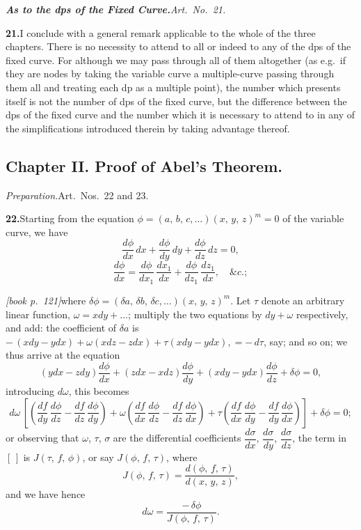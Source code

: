 \documentclass[11pt,a4paper]{article}
\theoremstyle{plain}
\theoremstyle{definition}
\theoremstyle{remark}
\begin{document}
\medskip\noindent\textit{\textbf{As to the dps of the Fixed Curve.}\quad Art.\ No.~21.}

\medskip\noindent\textbf{21.}\quad I conclude with a general remark applicable to the whole of the three chapters. There is no necessity to attend to all or indeed to any of the dps of the fixed curve. For although we may pass through all of them altogether (as e.g.\ if they are nodes by taking the variable curve a multiple-curve passing through them all and treating each dp as a multiple point), the number which presents itself is not the number of dps of the fixed curve, but the difference between the dps of the fixed curve and the number which it is necessary to attend to in any of the simplifications introduced therein by taking advantage thereof.

\subsection*{Chapter II. Proof of Abel's Theorem.}

\medskip\noindent\textit{Preparation.}\quad Art.\ Nos.\ 22 and 23.

\medskip\noindent\textbf{22.}\quad Starting from the equation $\phi = (a,\,b,\,c,\ldots)(x,\,y,\,z)^m = 0$ of the variable curve, we have
\[
\frac{d\phi}{dx}\,dx + \frac{d\phi}{dy}\,dy + \frac{d\phi}{dz}\,dz = 0,
\]
\[
\frac{d\phi}{dx} = \frac{d\phi}{dx_1}\,\frac{dx_1}{dx} + \frac{d\phi}{dz_1}\,\frac{dz_1}{dx},\quad \&c.;
\]

\noindent\textit{[book p.~121]}\quad where $\delta\phi = (\delta a,\,\delta b,\,\delta c,\ldots)(x,\,y,\,z)^m$. Let $\tau$ denote an arbitrary linear function, $\omega = x dy + \ldots$; multiply the two equations by $dy + \omega$ respectively, and add: the coefficient of $\delta a$ is $-\,(x dy - y dx) + \omega(x dz - z dx) + \tau(x dy - y dx), = -\,d\tau$, say; and so on; we thus arrive at the equation
\[
(y dx - z dy)\frac{d\phi}{dx} + (z dx - x dz)\frac{d\phi}{dy} + (x dy - y dx)\frac{d\phi}{dz} + \delta\phi = 0,
\]
introducing $d\omega$, this becomes
\[
d\omega\,\left[\left(\frac{df}{dy}\,\frac{d\phi}{dz} - \frac{df}{dz}\,\frac{d\phi}{dy}\right) + \omega\left(\frac{df}{dx}\,\frac{d\phi}{dz} - \frac{df}{dz}\,\frac{d\phi}{dx}\right) + \tau\left(\frac{df}{dx}\,\frac{d\phi}{dy} - \frac{df}{dy}\,\frac{d\phi}{dx}\right)\right] + \delta\phi = 0;
\]
or observing that $\omega$, $\tau$, $\sigma$ are the differential coefficients $\dfrac{d\sigma}{dx}$, $\dfrac{d\sigma}{dy}$, $\dfrac{d\sigma}{dz}$, the term in $[\,]$ is $J(\tau,\,f,\,\phi)$, or say $J(\phi,\,f,\,\tau)$, where
\[
J(\phi,\,f,\,\tau) = \frac{d(\phi,\,f,\,\tau)}{d(x,\,y,\,z)},
\]
and we have hence
\[
d\omega = \frac{-\,\delta\phi}{J(\phi,\,f,\,\tau)}.
\]
\end{document}
